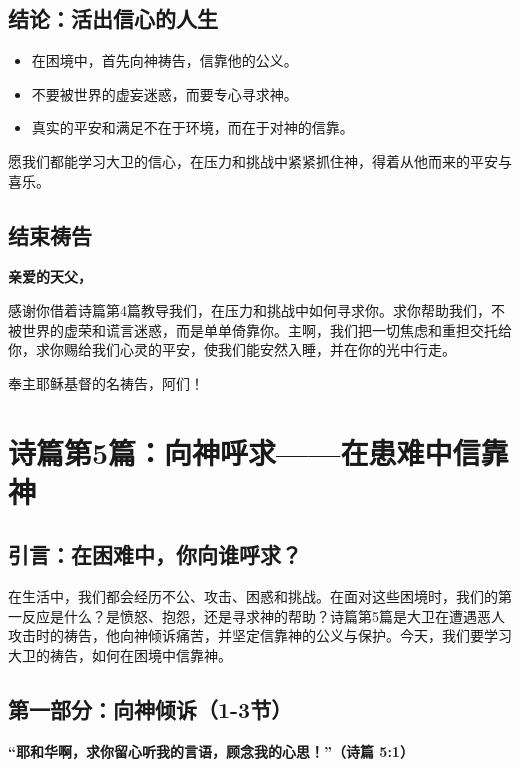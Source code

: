 \documentclass[a4paper, 12pt]{article}
\begin{document}
\subsection*{结论：活出信心的人生}

\begin{itemize}
    \item 在困境中，首先向神祷告，信靠他的公义。
    \item 不要被世界的虚妄迷惑，而要专心寻求神。
    \item 真实的平安和满足不在于环境，而在于对神的信靠。
\end{itemize}

愿我们都能学习大卫的信心，在压力和挑战中紧紧抓住神，得着从他而来的平安与喜乐。

\subsection*{结束祷告}

\textbf{亲爱的天父，}

感谢你借着诗篇第4篇教导我们，在压力和挑战中如何寻求你。求你帮助我们，不被世界的虚荣和谎言迷惑，而是单单倚靠你。主啊，我们把一切焦虑和重担交托给你，求你赐给我们心灵的平安，使我们能安然入睡，并在你的光中行走。

奉主耶稣基督的名祷告，阿们！



\newpage
\section{诗篇第5篇：向神呼求——在患难中信靠神}

\subsection*{引言：在困难中，你向谁呼求？}

在生活中，我们都会经历不公、攻击、困惑和挑战。在面对这些困境时，我们的第一反应是什么？是愤怒、抱怨，还是寻求神的帮助？诗篇第5篇是大卫在遭遇恶人攻击时的祷告，他向神倾诉痛苦，并坚定信靠神的公义与保护。今天，我们要学习大卫的祷告，如何在困境中信靠神。

\subsection*{第一部分：向神倾诉（1-3节）}

\textbf{“耶和华啊，求你留心听我的言语，顾念我的心思！”（诗篇 5:1）}
\end{document}
